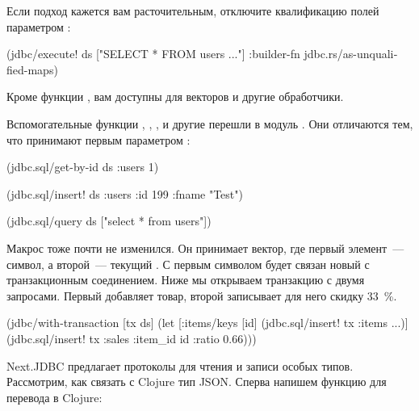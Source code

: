 
Если подход кажется вам расточительным, отключите квалификацию полей параметром :

\begin{english}
  \begin{clojure}
(jdbc/execute!
 ds
 ["SELECT * FROM users ..."]
 {:builder-fn jdbc.rs/as-unqualified-maps})
  \end{clojure}
\end{english}

Кроме функции , вам доступны  для векторов и другие обработчики.

Вспомогательные функции , , ,  и другие перешли в модуль . Они отличаются тем, что принимают первым параметром :

\begin{english}
  \begin{clojure}
(jdbc.sql/get-by-id ds :users 1)

(jdbc.sql/insert! ds :users {:id 199 :fname "Test"})

(jdbc.sql/query ds ["select * from users"])
  \end{clojure}
\end{english}


Макрос  тоже почти не изменился. Он принимает вектор, где первый элемент~--- символ, а второй~--- текущий . С первым символом будет связан новый  с транзакционным соединением. Ниже мы открываем транзакцию с двумя запросами. Первый добавляет товар, второй записывает для него скидку 33~\%.

\begin{english}
  \begin{clojure}
(jdbc/with-transaction
  [tx ds]
  (let [{:items/keys [id]}
        (jdbc.sql/insert! tx :items {...})]
    (jdbc.sql/insert!
       tx
       :sales
       {:item_id id :ratio 0.66})))
  \end{clojure}
\end{english}

Next.JDBC предлагает протоколы для чтения и записи особых типов. Рассмотрим, как связать с Clojure тип JSON. Сперва напишем функцию для перевода  в Clojure:


